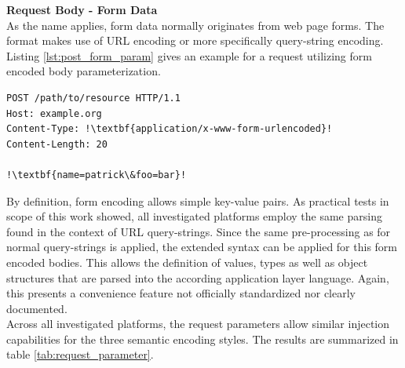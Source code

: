 \textbf{Request Body - Form Data}\\
As the name applies, form data normally originates from web page forms. The format makes use of URL encoding or more specifically query-string encoding. Listing \ref{lst:post_form_param} gives an example for a request utilizing form encoded body parameterization. \\

\begin{lstlisting}[escapechar=!, caption={Example for POST request with form encoded body parameterization}, label={lst:post_form_param}]
POST /path/to/resource HTTP/1.1
Host: example.org
Content-Type: !\textbf{application/x-www-form-urlencoded}!
Content-Length: 20

!\textbf{name=patrick\&foo=bar}!
\end{lstlisting}

By definition, form encoding allows simple key-value pairs. As practical tests in scope of this work showed, all investigated platforms employ the same parsing found in the context of URL query-strings. Since the same pre-processing as for normal query-strings is applied, the extended syntax can be applied for this form encoded bodies. This allows the definition of values, types as well as object structures that are parsed into the according application layer language. Again, this presents a convenience feature not officially standardized nor clearly documented.\\

Across all investigated platforms, the request parameters allow similar injection capabilities for the three semantic encoding styles. The results are summarized in table \ref{tab:request_parameter}. \\

